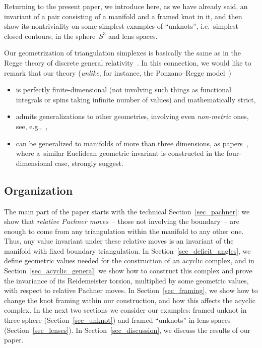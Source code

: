 \documentclass[pdftex]{sigma}
\begin{document}
Returning to the present paper, we introduce here, as we have already said, an invariant of a pair consisting of a manifold and a framed knot in it, and then show its nontriviality on some simplest examples of ``unknots'', i.e.\ simplest closed contours, in the sphere~$S^3$ and lens spaces.

Our geometrization of triangulation simplexes is basically the same as in the Regge theory of discrete general relativity~\cite{Regge}. In this connection, we would like to remark that our theory (\emph{unlike}, for instance, the Ponzano--Regge model~\cite{PR})
\begin{itemize}
\itemsep=0pt
	\item is perfectly f\/inite-dimensional (not involving such things as functional integrals or spins taking inf\/inite number of values) and mathematically strict,
	\item admits generalizations to other geometries, involving even \emph{non-metric} ones, see, e.g.,~\cite{SL2,KKM},
	\item can be generalized to manifolds of more than three dimensions, as papers~\cite{TMP33,TMP24,TMP15}, where a~similar Euclidean geometric invariant is constructed in the four-dimensional case, strongly suggest.
\end{itemize}


\subsection*{Organization}

The main part of the paper starts with the technical Section~\ref{sec_pachner}: we show that \emph{relative Pachner moves}~-- those not involving the boundary~-- are enough to come from any triangulation within the manifold to any other one. Thus, any value invariant under these relative moves is an invariant of the manifold with f\/ixed boundary triangulation. In Section~\ref{sec_deficit_angles}, we def\/ine geometric values needed for the construction of an acyclic complex, and in Section~\ref{sec_acyclic_general} we show how to construct this complex and prove the invariance of its Reidemeister torsion, multiplied by some geometric values, with respect to relative Pachner moves. In Section~\ref{sec_framing}, we show how to change the knot framing within our construction, and how this af\/fects the acyclic complex. In the next two sections we consider our examples: framed unknot in three-sphere (Section~\ref{sec_unknot}) and framed ``unknots'' in lens spaces (Section~\ref{sec_lenses}). In Section~\ref{sec_discussion}, we discuss the results of our paper.
\end{document}
